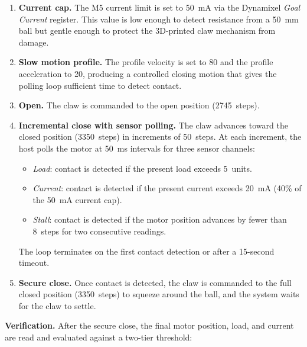 \begin{enumerate}
    \item \textbf{Current cap.} The M5 current limit is set to
    50~mA via the Dynamixel \emph{Goal Current} register. This
    value is low enough to detect resistance from a 50~mm ball
    but gentle enough to protect the 3D-printed claw mechanism
    from damage.

    \item \textbf{Slow motion profile.} The profile velocity is
    set to 80 and the profile acceleration to 20, producing a
    controlled closing motion that gives the polling loop
    sufficient time to detect contact.

    \item \textbf{Open.} The claw is commanded to the open
    position (2745~steps).

    \item \textbf{Incremental close with sensor polling.} The
    claw advances toward the closed position (3350~steps) in
    increments of 50~steps. At each increment, the host polls
    the motor at 50~ms intervals for three sensor channels:
    \begin{itemize}
        \item \emph{Load}: contact is detected if the present
              load exceeds 5~units.
        \item \emph{Current}: contact is detected if the
              present current exceeds 20~mA (40\% of the
              50~mA current cap).
        \item \emph{Stall}: contact is detected if the motor
              position advances by fewer than 8~steps for two
              consecutive readings.
    \end{itemize}
    The loop terminates on the first contact detection or after
    a 15-second timeout.

    \item \textbf{Secure close.} Once contact is detected, the
    claw is commanded to the full closed position (3350~steps)
    to squeeze around the ball, and the system waits for the
    claw to settle.
\end{enumerate}

\textbf{Verification.} After the secure close, the final motor
position, load, and current are read and evaluated against a
two-tier threshold:


